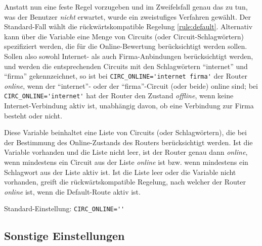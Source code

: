 Anstatt nun eine feste Regel vorzugeben und im Zweifelsfall genau das zu tun,
was der Benutzer \emph{nicht} erwartet, wurde ein zweistufiges Verfahren
gewählt. Der Standard-Fall wählt die rückwärtskompatible Regelung
\ref{rule:default}. Alternativ kann über die Variable 
eine Menge von Circuits (oder Circuit-Schlagwörtern) spezifiziert werden, die
für die Online-Bewertung berücksichtigt werden sollen. Sollen also sowohl
Internet- als auch Firma-Anbindungen berücksichtigt werden, und werden die
entsprechenden Circuits mit den Schlagwörtern ``internet'' und ``firma''
gekennzeichnet, so ist bei \verb+CIRC_ONLINE='internet firma'+ der Router
\emph{online}, wenn der ``internet''- oder der ``firma''-Circuit (oder beide)
online sind; bei \verb+CIRC_ONLINE='internet'+ hat der Router
den Zustand \emph{offline}, wenn keine Internet-Verbindung aktiv ist, unabhängig
davon, ob eine Verbindung zur Firma besteht oder nicht.

\begin{description}


Diese Variable beinhaltet eine Liste von Circuits (oder Schlagwörtern), die
bei der Bestimmung des Online-Zustands des Routers berücksichtigt werden. Ist
die Variable vorhanden und die Liste nicht leer, ist der Router genau dann
\emph{online}, wenn mindestens ein Circuit aus der Liste \emph{online} ist bzw.
wenn mindestens ein Schlagwort aus der Liste aktiv ist. Ist die Liste leer oder
die Variable nicht vorhanden, greift die rückwärtskompatible Regelung, nach
welcher der Router \emph{online} ist, wenn die Default-Route aktiv ist.

Standard-Einstellung: \verb+CIRC_ONLINE=''+

\end{description}

\subsection{Sonstige Einstellungen}

